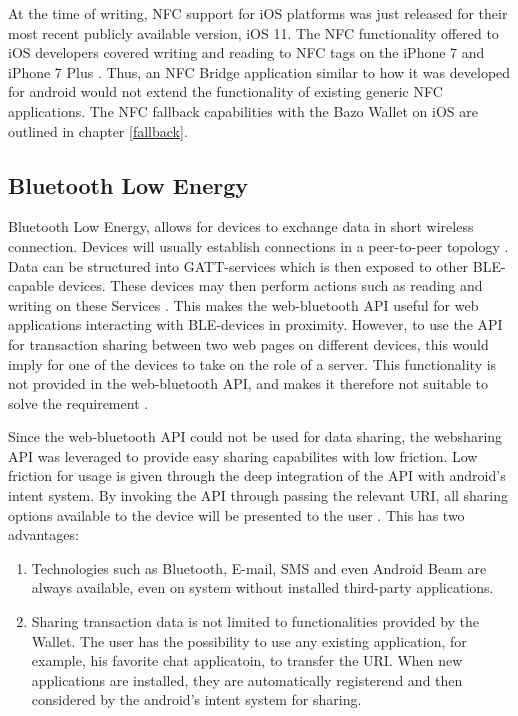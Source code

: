 At the time of writing, NFC support for iOS platforms was just released for their most recent publicly available version, iOS 11. The NFC functionality offered to iOS developers covered writing and reading to NFC tags on the iPhone 7 and iPhone 7 Plus \cite{corenfc}. Thus, an NFC Bridge application similar to how it was developed for android would not extend the functionality of existing generic NFC applications. The NFC fallback capabilities with the Bazo Wallet on iOS are outlined in chapter \ref{fallback}.
\subsection{Bluetooth Low Energy}\label{ble}
Bluetooth Low Energy, allows for devices to exchange data in short wireless connection. Devices will usually establish connections in a peer-to-peer topology \cite{blep2p}. Data can be structured into GATT-services which is then exposed to other BLE-capable devices. These devices may then perform actions such as reading and writing on these Services \cite{blegatt}. 
This makes the web-bluetooth API useful for web applications interacting with BLE-devices in proximity. However, to use the API for transaction sharing between two web pages on different devices, this would imply for one of the devices to take on the role of a server. This functionality is not provided in the web-bluetooth API, and makes it therefore not suitable to solve the requirement \cite{webble}. 

Since the web-bluetooth API could not be used for data sharing, the websharing API was leveraged to provide easy sharing capabilites with low friction. Low friction for usage is given through the deep integration of the API with android's intent system. By invoking the API through passing the relevant URI, all sharing options available to the device will be presented to the user \cite{webshareapi}. This has two advantages:
\begin{enumerate}
\item Technologies such as Bluetooth, E-mail, SMS and even Android Beam are always available, even on system without installed third-party applications.
\item Sharing transaction data is not limited to functionalities provided by the Wallet. The user has the possibility to use any existing application, for example, his favorite chat applicatoin, to transfer the URI. When new applications are installed, they are automatically registerend and then considered by the android's intent system for sharing.
\end{enumerate}

